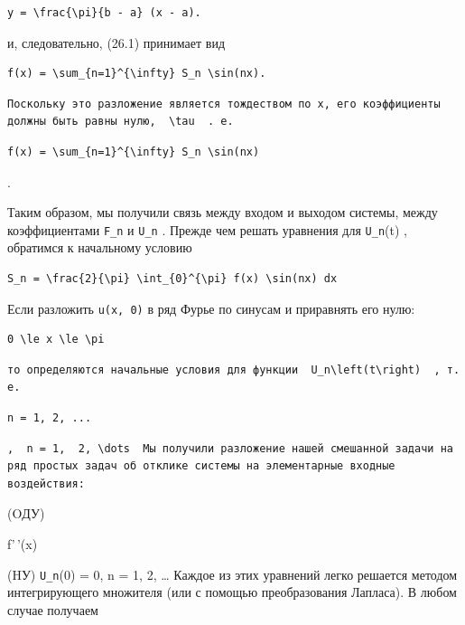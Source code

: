 \documentclass[
  ukrainian,
]{article}
\begin{document}
\begin{verbatim}
y = \frac{\pi}{b - a} (x - a).
\end{verbatim}

и, следовательно, (26.1) принимает вид

\begin{verbatim}
f(x) = \sum_{n=1}^{\infty} S_n \sin(nx).
\end{verbatim}

\begin{verbatim}
Поскольку это разложение является тождеством по x, его коэффициенты должны быть равны нулю,  \tau  . е.
\end{verbatim}

\begin{verbatim}
f(x) = \sum_{n=1}^{\infty} S_n \sin(nx)
\end{verbatim}

.

Таким образом, мы получили связь между входом и выходом системы, между
коэффициентами \texttt{F\_n} и \texttt{U\_n} . Прежде чем решать
уравнения для \texttt{U\_n}(t) , обратимся к начальному условию

\begin{verbatim}
S_n = \frac{2}{\pi} \int_{0}^{\pi} f(x) \sin(nx) dx
\end{verbatim}

Если разложить \texttt{u(x,\ 0)} в ряд Фурье по синусам и приравнять его
нулю:

\begin{verbatim}
0 \le x \le \pi
\end{verbatim}

\begin{verbatim}
то определяются начальные условия для функции  U_n\left(t\right)  , т. е.
\end{verbatim}

\begin{verbatim}
n = 1, 2, ...
\end{verbatim}

\begin{verbatim}
,  n = 1,  2, \dots  Мы получили разложение нашей смешанной задачи на ряд простых задач об отклике системы на элементарные входные воздействия:
\end{verbatim}

(OДУ)

f'\,'(x)

(HУ) \texttt{U\_n}(0) = 0, n = 1, 2, \ldots{} Каждое из этих уравнений
легко решается методом интегрирующего множителя (или с помощью
преобразования Лапласа). В любом случае получаем
\end{document}
